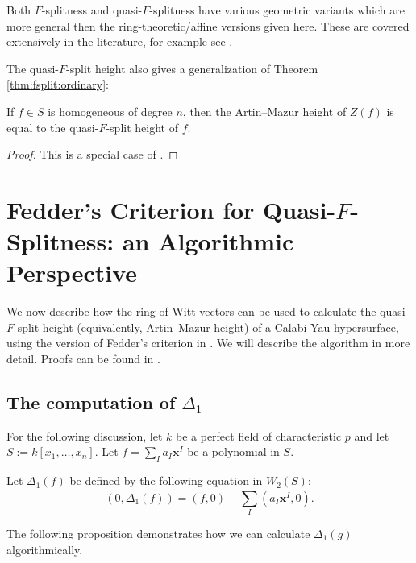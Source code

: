 \begin{rmk}
	Both \(F\)-splitness and quasi-\(F\)-splitness have 
	various geometric
	variants which are more general then the 
	ring-theoretic/affine versions given here. 
	These are covered extensively in the literature, for example
	see \cite{kttwyy-2022-qfs-birat}.
\end{rmk}

The quasi-\(F\)-split height also gives a generalization
of Theorem \ref{thm:fsplit:ordinary}:

\begin{thm}
	If \(f \in S\) is homogeneous of degree \(n\),
	then the Artin--Mazur height of \(Z(f)\)
	is equal to the quasi-\(F\)-split height
	of \(f\).
\end{thm}

\begin{proof}
	This is a special case of 
	\cite[Theorem~4.5]{yobuko-2019-qfs-calabi-yau}.
\end{proof}

\section{Fedder's Criterion for Quasi-\(F\)-Splitness: an Algorithmic Perspective}

We now describe how the ring of Witt vectors can be used to calculate the 
quasi-\(F\)-split height (equivalently, Artin--Mazur height) of a Calabi-Yau 
hypersurface, using the version of Fedder's criterion in \cite{kty-2022-fedder}.
We will describe the algorithm in more detail. Proofs can be
found in \cite{kty-2022-fedder}.

\subsection{The computation of \(\Delta_{1}\)}

For the following discussion, 
let \(k\) be a perfect field of characteristic \(p\) and 
let \(S := k[x_{1}, \ldots, x_{n}]\).
Let \(f = \sum_{I}^{} a_{I}\mathbf{x}^{I}\) be a polynomial in \(S\).

\begin{defn}
	Let \(\Delta_{1}(f)\)
	be defined by the following equation in \(W_{2}(S)\):
	\[
		(0, \Delta_{1}(f)) = (f,0) - \sum_{I}^{} (a_{I}\mathbf{x}^{I}, 0) 
	.\] 
\end{defn}

The following proposition demonstrates how we can calculate 
\(\Delta_{1}(g)\) algorithmically.

